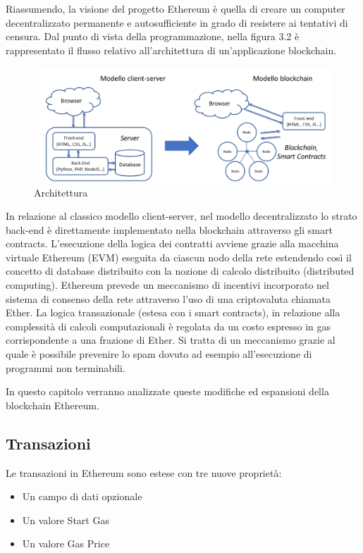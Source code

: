 Riassumendo, la visione del progetto Ethereum è quella di creare un computer decentralizzato permanente e autosufficiente in grado di resistere ai tentativi di censura. Dal punto di vista della programmazione, nella figura 3.2 è rappresentato il flusso relativo all’architettura di un’applicazione blockchain.

\begin{figure}[H]
\centering
\includegraphics[width=1\textwidth]{immagini/architetturav1.png}
\caption{Architettura}
\label{fig:mesh8}
\end{figure}

In relazione al classico modello client-server, nel modello decentralizzato lo strato back-end è direttamente implementato nella blockchain attraverso gli smart contracts. L’esecuzione della logica dei contratti avviene grazie alla macchina virtuale Ethereum (EVM) eseguita da ciascun nodo della rete estendendo così il concetto di database distribuito con la nozione di calcolo distribuito (distributed computing).  Ethereum prevede un meccanismo di incentivi incorporato nel sistema di consenso della rete attraverso l’uso di una criptovaluta chiamata Ether. La logica transazionale (estesa con i smart contracts), in relazione alla complessità di calcoli computazionali è regolata da un costo espresso in gas corrispondente a una frazione di Ether. Si tratta di un meccanismo grazie al quale è possibile prevenire lo spam dovuto ad esempio all’esecuzione di programmi non terminabili. 

In questo capitolo verranno analizzate queste modifiche ed espansioni della blockchain Ethereum.

\subsection{Transazioni}

Le transazioni in Ethereum sono estese con tre nuove proprietà:

\begin{itemize}
\item Un campo di dati opzionale
\item Un valore Start Gas
\item Un valore Gas Price
\end{itemize}

